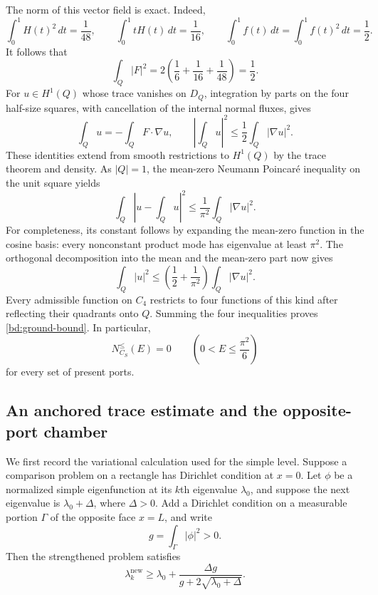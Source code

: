\documentclass[11pt,reqno]{amsart}
\numberwithin{equation}{section}
\begin{document}
The norm of this vector field is exact. Indeed,
\[
 \int_0^1 H(t)^2\,dt=\frac1{48},\qquad
 \int_0^1 tH(t)\,dt=\frac1{16},\qquad
 \int_0^1 f(t)\,dt=\int_0^1 f(t)^2\,dt=\frac12.
\]
It follows that
\begin{equation}
 \int_Q |F|^2
 =2\left(\frac16+\frac1{16}+\frac1{48}\right)
 =\frac12.
 \label{bd:field-norm}
\end{equation}
For $u\in H^1(Q)$ whose trace vanishes on $D_Q$, integration by parts
on the four half-size squares, with cancellation of the internal normal
fluxes, gives
\[
 \int_Q u=-\int_Q F\cdot\nabla u,
 \qquad
 \left|\int_Q u\right|^2\le\frac12\int_Q|\nabla u|^2.
\]
These identities extend from smooth restrictions to $H^1(Q)$ by the
trace theorem and density. As $|Q|=1$, the mean-zero Neumann Poincar\'e
inequality on the unit square yields
\[
 \int_Q\left|u-\int_Q u\right|^2
 \le\frac1{\pi^2}\int_Q|\nabla u|^2.
\]
For completeness, its constant follows by expanding the mean-zero
function in the cosine basis: every nonconstant product mode has
eigenvalue at least $\pi^2$. The orthogonal decomposition into the mean
and the mean-zero part now gives
\[
 \int_Q|u|^2
 \le\left(\frac12+\frac1{\pi^2}\right)\int_Q|\nabla u|^2.
\]
Every admissible function on $C_4$ restricts to four functions of this
kind after reflecting their quadrants onto $Q$. Summing the four
inequalities proves \eqref{bd:ground-bound}. In particular,
\begin{equation}
 N_{C_S}^{\le}(E)=0\qquad
 \left(0<E\le\frac{\pi^2}{6}\right)
 \label{bd:no-ground}
\end{equation}
for every set of present ports.

\subsection{An anchored trace estimate and the opposite-port chamber}
\label{bd:opposite}

We first record the variational calculation used for the simple level.
Suppose a comparison problem on a rectangle has Dirichlet condition at
$x=0$. Let $\phi$ be a normalized simple eigenfunction at its $k$th
eigenvalue $\lambda_0$, and suppose the next eigenvalue is
$\lambda_0+\Delta$, where $\Delta>0$. Add a Dirichlet condition on a
measurable portion $\Gamma$ of the opposite face $x=L$, and write
\[
 g=\int_\Gamma |\phi|^2>0.
\]
Then the strengthened problem satisfies
\begin{equation}
 \lambda_k^{\mathrm{new}}
 \ge\lambda_0+\frac{\Delta g}{g+2\sqrt{\lambda_0+\Delta}}.
 \label{bd:scalar-lift}
\end{equation}
\end{document}
